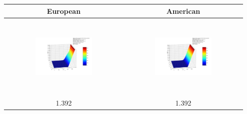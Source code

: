 \documentclass[10pt,a4paper]{article}
\begin{document}
		\begin{table}
		\begin{tabular}{|c|c|}
		\hline
		European & American \\
		\hline
		\includegraphics[width=0.5\textwidth, height=40mm]{Black-Scholes_K1600.0_sigma0.2_r0.01_beta2e-06_T0.9_nonlinear_european.png}
		& \includegraphics[width=0.5\textwidth, height=40mm]{Black-Scholes_K1600.0_sigma0.2_r0.01_beta2e-06_T0.9_nonlinear_american.png} \\
		1.392
		& 1.392 \\
		

\end{tabular}
\end{table}
\end{document}
